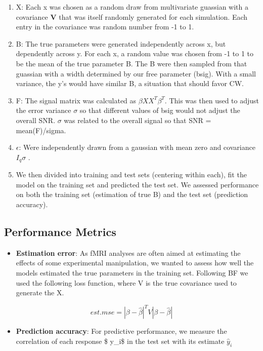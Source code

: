 \documentclass{article}
\begin{document}
\begin{enumerate}
\def\labelenumi{\arabic{enumi}.}
\item
  X: Each x was chosen as a random draw from multivariate guassian with
  a covariance $ \textbf{V} $ that was itself randomly generated for
  each simulation. Each entry in the covariance was random number from
  -1 to 1.
\item
  B: The true parameters were generated independently across x, but
  dependently across y. For each x, a random value was chosen from -1 to
  1 to be the mean of the true parameter B. The B were then sampled from
  that guassian with a width determined by our free parameter (bsig).
  With a small variance, the y's would have similar B, a situation that
  should favor CW.
\item
  F: The signal matrix was calculated as $ \beta XX^{T} \beta^{T} $.
  This was then used to adjust the error variance \(\sigma\) so that
  different values of bsig would not adjust the overall SNR. $
  \sigma $ was related to the overall signal so that SNR =
  mean(F)/sigma.
\item
  $ \epsilon $: Were independently drawn from a gaussian with mean
  zero and covariance $ I_q \sigma $ .
\item
  We then divided into training and test sets (centering within each),
  fit the model on the training set and predicted the test set. We
  assessed performance on both the training set (estimation of true B)
  and the test set (prediction accuracy).
\end{enumerate}

\subsection{Performance Metrics}\label{performance-metrics}

\begin{itemize}
\itemsep1pt\parskip0pt
\item
  \textbf{Estimation error}: As fMRI analyses are often aimed at
  estimating the effects of some experimental manipulation, we wanted to
  assess how well the models estimated the true parameters in the
  training set. Following BF we used the following loss function, where
  V is the true covariance used to generate the X.
\end{itemize}

\[ est.mse = |\beta-\hat \beta|^T V |\beta - \hat \beta| \]

\begin{itemize}
\itemsep1pt\parskip0pt
\item
  \textbf{Prediction accuracy}: For predictive performance, we measure
  the correlation of each response \$ y\_i\$ in the test set with its
  estimate \(\hat y_i\)
\end{itemize}
\end{document}
